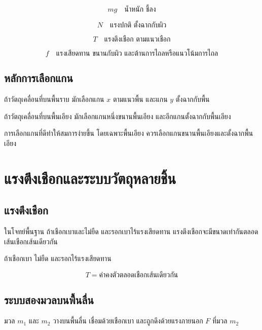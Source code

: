 \begin{tcolorbox}[title=แรงที่พบบ่อยใน free-body diagram]
\[
mg \quad \text{น้ำหนัก ชี้ลง}
\]

\[
N \quad \text{แรงปกติ ตั้งฉากกับผิว}
\]

\[
T \quad \text{แรงตึงเชือก ตามแนวเชือก}
\]

\[
f \quad \text{แรงเสียดทาน ขนานกับผิว และต้านการไถลหรือแนวโน้มการไถล}
\]
\end{tcolorbox}

\subsection{หลักการเลือกแกน}

ถ้าวัตถุเคลื่อนที่บนพื้นราบ มักเลือกแกน $x$ ตามแนวพื้น และแกน $y$ ตั้งฉากกับพื้น

ถ้าวัตถุเคลื่อนที่บนพื้นเอียง มักเลือกแกนหนึ่งขนานพื้นเอียง และอีกแกนตั้งฉากกับพื้นเอียง

\begin{tcolorbox}[title=ข้อควรจำ]
การเลือกแกนที่ดีทำให้สมการง่ายขึ้น โดยเฉพาะพื้นเอียง ควรเลือกแกนขนานพื้นเอียงและตั้งฉากพื้นเอียง
\end{tcolorbox}

\section{แรงตึงเชือกและระบบวัตถุหลายชิ้น}

\subsection{แรงตึงเชือก}

ในโจทย์พื้นฐาน ถ้าเชือกเบาและไม่ยืด และรอกเบาไร้แรงเสียดทาน แรงตึงเชือกจะมีขนาดเท่ากันตลอดเส้นเชือกเส้นเดียวกัน

\begin{tcolorbox}[title=แรงตึงเชือกในอุดมคติ]
ถ้าเชือกเบา ไม่ยืด และรอกไร้แรงเสียดทาน

\[
T=\text{ค่าคงตัวตลอดเชือกเส้นเดียวกัน}
\]
\end{tcolorbox}

\subsection{ระบบสองมวลบนพื้นลื่น}

มวล $m_1$ และ $m_2$ วางบนพื้นลื่น เชื่อมด้วยเชือกเบา และถูกดึงด้วยแรงภายนอก $F$ ที่มวล $m_2$

